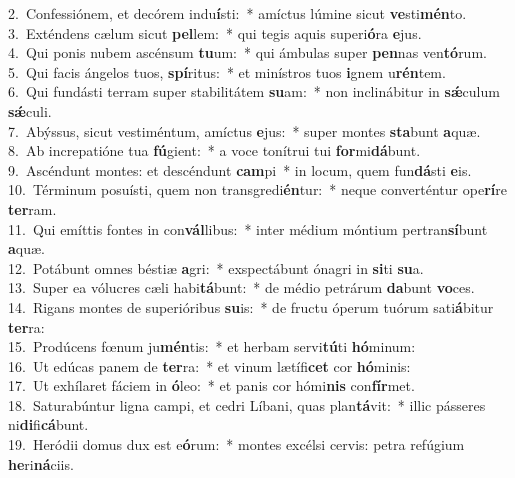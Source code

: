 {2.~}Confessiónem, et decórem indu\textbf{í}sti:~* amíctus lúmine sicut \textbf{ve}sti\textbf{mén}to.\\
{3.~}Exténdens cælum sicut \textbf{pel}lem:~* qui tegis aquis superi\textbf{ó}ra \textbf{e}jus.\\
{4.~}Qui ponis nubem ascénsum \textbf{tu}um:~* qui ámbulas super \textbf{pen}nas ven\textbf{tó}rum.\\
{5.~}Qui facis ángelos tuos, \textbf{spí}ritus:~* et minístros tuos \textbf{i}gnem u\textbf{rén}tem.\\
{6.~}Qui fundásti terram super stabilitátem \textbf{su}am:~* non inclinábitur in \textbf{sǽ}culum \textbf{sǽ}culi.\\
{7.~}Abýssus, sicut vestiméntum, amíctus \textbf{e}jus:~* super montes \textbf{sta}bunt \textbf{a}quæ.\\
{8.~}Ab increpatióne tua \textbf{fú}gient:~* a voce tonítrui tui \textbf{for}mi\textbf{dá}bunt.\\
{9.~}Ascéndunt montes: et descéndunt \textbf{cam}pi~* in locum, quem fun\textbf{dá}sti \textbf{e}is.\\
{10.~}Términum posuísti, quem non transgredi\textbf{én}tur:~* neque converténtur ope\textbf{rí}re \textbf{ter}ram.\\
{11.~}Qui emíttis fontes in con\textbf{vál}libus:~* inter médium móntium pertran\textbf{sí}bunt \textbf{a}quæ.\\
{12.~}Potábunt omnes béstiæ \textbf{a}gri:~* exspectábunt ónagri in \textbf{si}ti \textbf{su}a.\\
{13.~}Super ea vólucres cæli habi\textbf{tá}bunt:~* de médio petrárum \textbf{da}bunt \textbf{vo}ces.\\
{14.~}Rigans montes de superióribus \textbf{su}is:~* de fructu óperum tuórum sati\textbf{á}bitur \textbf{ter}ra:\\
{15.~}Prodúcens fœnum ju\textbf{mén}tis:~* et herbam servi\textbf{tú}ti \textbf{hó}minum:\\
{16.~}Ut edúcas panem de \textbf{ter}ra:~* et vinum lætífi\textbf{cet} cor \textbf{hó}minis:\\
{17.~}Ut exhílaret fáciem in \textbf{ó}leo:~* et panis cor hómi\textbf{nis} con\textbf{fír}met.\\
{18.~}Saturabúntur ligna campi, et cedri Líbani, quas plan\textbf{tá}vit:~* illic pásseres ni\textbf{di}fi\textbf{cá}bunt.\\
{19.~}Heródii domus dux est e\textbf{ó}rum:~* montes excélsi cervis: petra refúgium \textbf{he}ri\textbf{ná}ciis.\\

